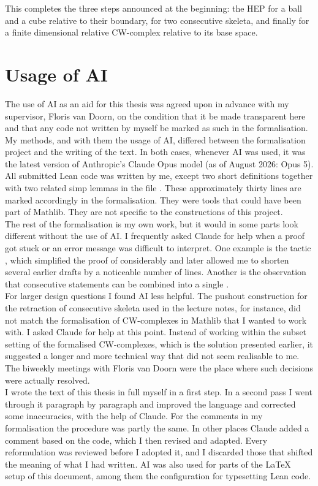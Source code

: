 \documentclass[11pt, a4paper, english]{article}
\theoremstyle{plain}
\theoremstyle{definition}
\theoremstyle{remark}
\numberwithin{equation}{section}
\numberwithin{theorem}{section}
\begin{document}
This completes the three steps announced at the beginning: the HEP for a ball and a cube relative to their boundary, for two consecutive skeleta, and finally for a finite dimensional relative CW-complex relative to its base space.

\clearpage
\section{Usage of AI} \label{section:methodes}
The use of AI as an aid for this thesis was agreed upon in advance with my supervisor, Floris van Doorn, on the condition that it be made transparent here and that any code not written by myself be marked as such in the formalisation. My methods, and with them the usage of AI, differed between the formalisation project and the writing of the text. In both cases, whenever AI was used, it was the latest version of Anthropic's Claude Opus model (as of August 2026: Opus 5).\\
All submitted Lean code was written by me, except two short definitions together with two related simp lemmas in the file . These approximately thirty lines are marked accordingly in the formalisation. They were tools that could have been part of Mathlib. They are not specific to the constructions of this project.\\
The rest of the formalisation is my own work, but it would in some parts look different without the use of AI. I frequently asked Claude for help when a proof got stuck or an error message was difficult to interpret. One example is the tactic , which simplified the proof of  considerably and later allowed me to shorten several earlier drafts by a noticeable number of lines. Another is the observation that consecutive  statements can be combined into a single . \\
For larger design questions I found AI less helpful. The pushout construction for the retraction of consecutive skeleta used in the lecture notes, for instance, did not match the formalisation of CW-complexes in Mathlib that I wanted to work with. I asked Claude for help at this point. Instead of working within the subset setting of the formalised CW-complexes, which is the solution presented earlier, it suggested a longer and more technical way that did not seem realisable to me. The biweekly meetings with Floris van Doorn were the place where such decisions were actually resolved.\\
I wrote the text of this thesis in full myself in a first step. In a second pass I went through it paragraph by paragraph and improved the language and corrected some inaccuracies, with the help of Claude. For the comments in my formalisation the procedure was partly the same. In other places Claude added a comment based on the code, which I then revised and adapted. Every reformulation was reviewed before I adopted it, and I discarded those that shifted the meaning of what I had written. AI was also used for parts of the \LaTeX{} setup of this document, among them the configuration for typesetting Lean code.
\end{document}
